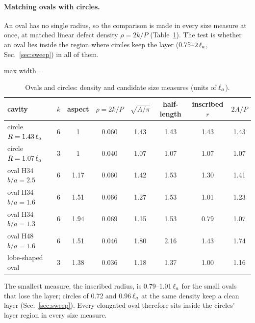 \paragraph{Matching ovals with circles.} An oval has no single radius, so the comparison is made in every size measure at once,
at matched linear defect density $\rho=2k/P$ (Table~\ref{tab:match}). The test is whether an oval lies inside the region where
circles keep the layer (0.75--$2\,\ell_a$, Sec.~\ref{sec:sweep}) in all of them.
\begin{table}[H]\centering\small
\caption{Ovals and circles: density and candidate size measures (units of $\ell_a$).}\label{tab:match}
\begin{adjustbox}{max width=\textwidth}
\begin{tabular}{lccccccc}\toprule
cavity & $k$ & aspect & $\rho=2k/P$ & $\sqrt{A/\pi}$ & half-length & inscribed $r$ & $2A/P$\\\midrule
circle $R=1.43\,\ell_a$ & 6 & 1 & 0.060 & 1.43 & 1.43 & 1.43 & 1.43\\
circle $R=1.07\,\ell_a$ & 3 & 1 & 0.040 & 1.07 & 1.07 & 1.07 & 1.07\\
oval H34 $b/a=2.5$ & 6 & 1.17 & 0.060 & 1.42 & 1.53 & 1.30 & 1.41\\
oval H34 $b/a=1.6$ & 6 & 1.51 & 0.066 & 1.27 & 1.53 & 1.01 & 1.23\\
oval H34 $b/a=1.3$ & 6 & 1.94 & 0.069 & 1.15 & 1.53 & 0.79 & 1.07\\
oval H48 $b/a=1.6$ & 6 & 1.51 & 0.046 & 1.80 & 2.16 & 1.43 & 1.74\\
lobe-shaped oval & 3 & 1.38 & 0.036 & 1.18 & 1.37 & 1.00 & 1.16\\\bottomrule
\end{tabular}
\end{adjustbox}
\end{table}
The smallest measure, the inscribed radius, is 0.79--1.01\,$\ell_a$ for the small ovals that lose the layer; circles of 0.72 and
0.96\,$\ell_a$ at the same density keep a clean layer (Sec.~\ref{sec:sweep}). Every elongated oval therefore sits inside the circles'
layer region in every size measure.
